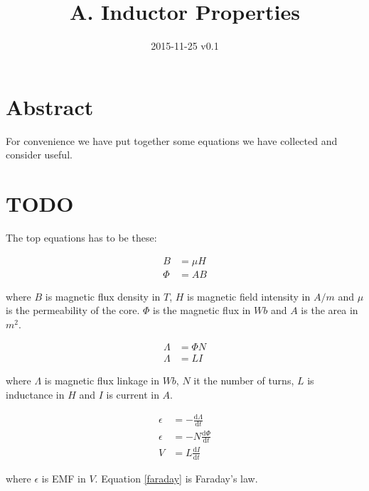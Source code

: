 \documentclass[]{../common/elementary-physics}
\title{A. Inductor Properties}
\date{2015-11-25 v0.1}
\begin{document}
\maketitle

\tableofcontents

\section{Abstract}

For convenience we have put together some equations we have collected and consider useful.

\section{TODO}

The top equations has to be these:

\begin{subequations}
\begin{align}
B &= \mu H \\
\Phi &= A B
\end{align}
\end{subequations}

where $B$ is magnetic flux density in $T$, $H$ is magnetic field intensity in $A/m$ and $\mu$ is the permeability of the core.
$\Phi$ is the magnetic flux in $Wb$ and $A$ is the area in $m^2$.

\begin{subequations}
\begin{align}
\Lambda &= \Phi N \\
\Lambda &= L I
\end{align}
\end{subequations}

where $\Lambda$ is magnetic flux linkage in $Wb$, $N$ it the number of turns, $L$ is inductance in $H$ and $I$ is current in $A$.

\begin{subequations}
\begin{align}
\epsilon &= - \frac{\mathrm{d}\Lambda}{\mathrm{d}t} \\
\epsilon &= - N \frac{\mathrm{d}\Phi}{\mathrm{d}t} \label{faraday} \\
V &= L \frac{\mathrm{d}I}{\mathrm{d}t}
\end{align}
\end{subequations}

where $\epsilon$ is EMF in $V$.
Equation \eqref{faraday} is Faraday's law.
\end{document}
